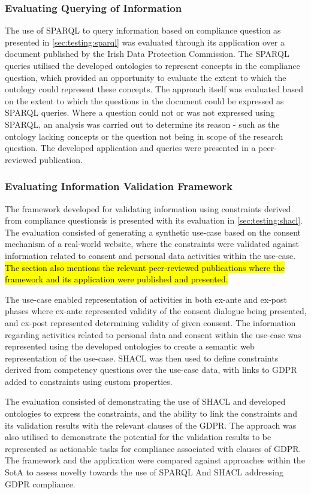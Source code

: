 \subsubsection{Evaluating Querying of Information}
The use of SPARQL to query information based on compliance question as presented in \autoref{sec:testing:sparql} was evaluated through its application over a document published by the Irish Data Protection Commission.
The SPARQL queries utilised the developed ontologies to represent concepts in the compliance question, which provided an opportunity to evaluate the extent to which the ontology could represent these concepts.
The approach itself was evaluated based on the extent to which the questions in the document could be expressed as SPARQL queries.
Where a question could not or was not expressed using SPARQL, an analysis was carried out to determine its reason - such as the ontology lacking concepts or the question not being in scope of the research question.
The developed application and queries were presented in a peer-reviewed publication.

\subsubsection{Evaluating Information Validation Framework}
The framework developed for validating information using constraints derived from compliance questionsis is presented with its evaluation in \autoref{sec:testing:shacl}.
The evaluation consisted of generating a synthetic use-case based on the consent mechanism of a real-world website, where the constraints were validated against information related to consent and personal data activities within the use-case.
\hl{The section also mentions the relevant peer-reviewed publications where the framework and its application were published and presented.}

The use-case enabled representation of activities in both ex-ante and ex-post phases where ex-ante represented validity of the consent dialogue being presented, and ex-post represented determining validity of given consent.
The information regarding activities related to personal data and consent within the use-case was represented using the developed ontologies to create a semantic web representation of the use-case.
SHACL was then used to define constraints derived from competency questions over the use-case data, with links to GDPR added to constraints using custom properties.

The evaluation consisted of demonstrating the use of SHACL and developed ontologies to express the constraints, and the ability to link the constraints and its validation results with the relevant clauses of the GDPR.
The approach was also utilised to demonstrate the potential for the validation results to be represented as actionable tasks for compliance associated with clauses of GDPR.
The framework and the application were compared against approaches within the SotA to assess novelty towards the use of SPARQL And SHACL addressing GDPR compliance.

